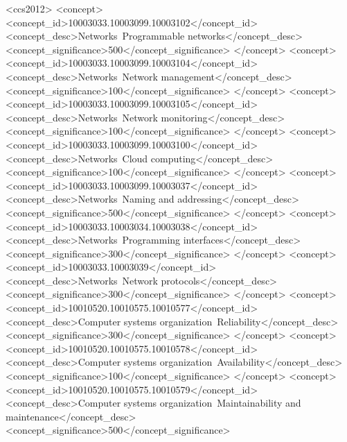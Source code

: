 \keywords{
\TitlePageDataKeywords%
}%
%
%
%
%
%
%
\begin{CCSXML}
<ccs2012>
   <concept>
       <concept_id>10003033.10003099.10003102</concept_id>
       <concept_desc>Networks~Programmable networks</concept_desc>
       <concept_significance>500</concept_significance>
       </concept>
   <concept>
       <concept_id>10003033.10003099.10003104</concept_id>
       <concept_desc>Networks~Network management</concept_desc>
       <concept_significance>100</concept_significance>
       </concept>
   <concept>
       <concept_id>10003033.10003099.10003105</concept_id>
       <concept_desc>Networks~Network monitoring</concept_desc>
       <concept_significance>100</concept_significance>
       </concept>
   <concept>
       <concept_id>10003033.10003099.10003100</concept_id>
       <concept_desc>Networks~Cloud computing</concept_desc>
       <concept_significance>100</concept_significance>
       </concept>
   <concept>
       <concept_id>10003033.10003099.10003037</concept_id>
       <concept_desc>Networks~Naming and addressing</concept_desc>
       <concept_significance>500</concept_significance>
       </concept>
   <concept>
       <concept_id>10003033.10003034.10003038</concept_id>
       <concept_desc>Networks~Programming interfaces</concept_desc>
       <concept_significance>300</concept_significance>
       </concept>
   <concept>
       <concept_id>10003033.10003039</concept_id>
       <concept_desc>Networks~Network protocols</concept_desc>
       <concept_significance>300</concept_significance>
       </concept>
   <concept>
       <concept_id>10010520.10010575.10010577</concept_id>
       <concept_desc>Computer systems organization~Reliability</concept_desc>
       <concept_significance>300</concept_significance>
       </concept>
   <concept>
       <concept_id>10010520.10010575.10010578</concept_id>
       <concept_desc>Computer systems organization~Availability</concept_desc>
       <concept_significance>100</concept_significance>
       </concept>
   <concept>
       <concept_id>10010520.10010575.10010579</concept_id>
       <concept_desc>Computer systems organization~Maintainability and maintenance</concept_desc>
       <concept_significance>500</concept_significance>

\end{CCSXML}
